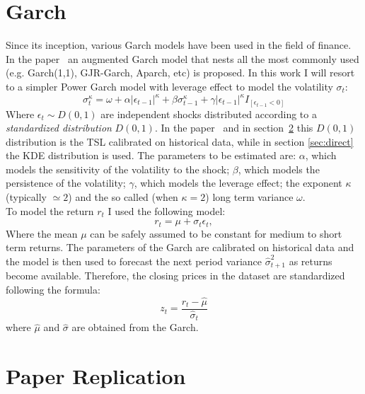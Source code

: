 \documentclass[11pt]{article}
\begin{document}
    \section{Garch} \label{sec:garch}
        Since its inception, various Garch models have been used in the field of finance.
        In the paper~\cite{thorsten} an augmented Garch model that nests all the most commonly used (e.g. Garch(1,1), GJR-Garch, Aparch, etc) is proposed.
        In this work I will resort to a simpler Power Garch model with leverage effect to model the volatility $\sigma_t$:
        \begin{equation}
            \sigma_t^\kappa = \omega
            + \alpha \left|\epsilon_{t-1}\right|^\kappa
            + \beta \sigma_{t-1}^\kappa
            + \gamma \left|\epsilon_{t-1}\right|^\kappa I_{[\epsilon_{t-1}<0]}
        \end{equation}
        Where $\epsilon_t \sim D(0,1)$ are independent shocks distributed according to a \textit{standardized distribution} $D(0,1)$.
        In the paper~\cite{thorsten} and in section~\ref{sec:replication} this $D(0,1)$ distribution is the TSL calibrated on historical data, while in section \ref{sec:direct} the KDE distribution is used.
        The parameters to be estimated are: $\alpha$, which models the sensitivity of the volatility to the shock; $\beta$, which models the persistence of the volatility; $\gamma$, which models the leverage effect; the exponent $\kappa$ (typically $\simeq 2$) and the so called (when $\kappa=2$) long term variance $\omega$.\\
        To model the return $r_t$ I used the following model:
        \begin{equation}
                r_t = \mu + \sigma_t \epsilon_t,
        \end{equation}
        Where the mean $\mu$ can be safely assumed to be constant for medium to short term returns.
        The parameters of the Garch are calibrated on historical data and the model is then used to forecast the next period variance $\hat \sigma_{t+1}^2$ as returns become available.
        Therefore, the closing prices in the dataset are standardized following the formula:
        \begin{equation}
            z_t = \frac{r_t - \hat \mu}{\hat \sigma_t}
        \end{equation}
        where $\hat \mu$ and $\hat \sigma$ are obtained from the Garch.
        

    \section{Paper Replication} \label{sec:replication}
\end{document}
